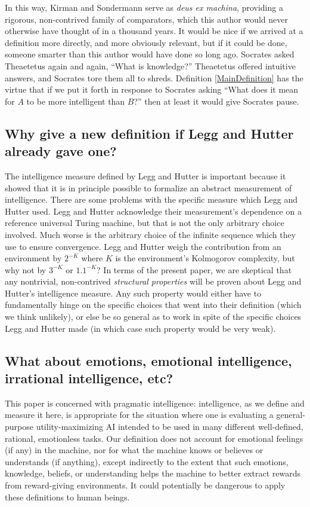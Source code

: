 \documentclass[twoside,11pt]{article}
\begin{document}
In this way, Kirman and Sondermann serve as \emph{deus ex machina}, providing
a rigorous, non-contrived family of comparators, which this author would never otherwise
have thought of in a thousand years. It would be nice if we arrived
at a definition more directly, and more obviously relevant,
but if it could be done, someone smarter
than this author would have done so long ago.
Socrates asked Theaetetus again and again,
``What is
knowledge?'' Theaetetus offered intuitive answers, and Socrates tore them
all to shreds. Definition \ref{MainDefinition} has the virtue that
if we put it forth in response to Socrates asking ``What does it mean for $A$ to
be more intelligent than $B$?'' then at least it would give Socrates pause.

\subsection{Why give a new definition if Legg and Hutter already gave one?}

The intelligence measure defined by Legg and Hutter is important because it showed
that it is in principle possible to formalize an abstract measurement of intelligence.
There are some problems with the specific measure which Legg and Hutter used.
Legg and Hutter acknowledge their measurement's dependence on a
reference universal Turing machine, but that is not the only arbitrary choice involved.
Much worse is the arbitrary choice of the infinite sequence which they use to ensure
convergence. Legg and Hutter weigh the contribution from an environment by $2^{-K}$ where
$K$ is the environment's Kolmogorov complexity, but why not by $3^{-K}$ or $1.1^{-K}$?
In terms of the present paper, we are skeptical that any nontrivial, non-contrived
\emph{structural properties} will be proven about Legg and Hutter's intelligence measure.
Any such property would either have to fundamentally hinge on the specific
choices that went into their definition (which we think unlikely),
or else be so general as to work in spite of the specific choices Legg and Hutter made
(in which case such property would be very weak).

\subsection{What about emotions, emotional intelligence, irrational intelligence, etc?}

This paper is concerned with pragmatic intelligence: intelligence,
as we define and measure it here, is appropriate for the situation where one
is evaluating a general-purpose utility-maximizing AI intended to be used in many different
well-defined, rational, emotionless tasks. Our definition does not account for
emotional feelings (if any) in the machine, nor for what the machine knows or believes
or understands (if anything), except indirectly to the extent that such emotions,
knowledge, beliefs, or understanding helps the machine to better extract rewards
from reward-giving environments.
It could potentially be dangerous to apply these definitions to human beings.
\end{document}
